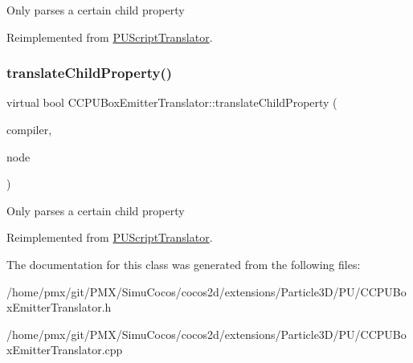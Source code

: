 Only parses a certain child property 

Reimplemented from \hyperlink{classPUScriptTranslator_a0374d83a8a04e57918975d525e0f8fe8}{P\+U\+Script\+Translator}.

\mbox{\label{classCCPUBoxEmitterTranslator_ada236c8cb79238baf289d30c266a09fa}} 
\subsubsection{\texorpdfstring{translate\+Child\+Property()}{translateChildProperty()}\hspace{0.1cm}{\footnotesize\ttfamily [2/2]}}
{\footnotesize\ttfamily virtual bool C\+C\+P\+U\+Box\+Emitter\+Translator\+::translate\+Child\+Property (\begin{DoxyParamCaption}\item[{\hyperlink{classPUScriptCompiler}{P\+U\+Script\+Compiler} $\ast$}]{compiler,  }\item[{\hyperlink{classPUAbstractNode}{P\+U\+Abstract\+Node} $\ast$}]{node }\end{DoxyParamCaption})\hspace{0.3cm}{\ttfamily [virtual]}}

Only parses a certain child property 

Reimplemented from \hyperlink{classPUScriptTranslator_a0374d83a8a04e57918975d525e0f8fe8}{P\+U\+Script\+Translator}.



The documentation for this class was generated from the following files\+:\begin{DoxyCompactItemize}
\item 
/home/pmx/git/\+P\+M\+X/\+Simu\+Cocos/cocos2d/extensions/\+Particle3\+D/\+P\+U/C\+C\+P\+U\+Box\+Emitter\+Translator.\+h\item 
/home/pmx/git/\+P\+M\+X/\+Simu\+Cocos/cocos2d/extensions/\+Particle3\+D/\+P\+U/C\+C\+P\+U\+Box\+Emitter\+Translator.\+cpp\end{DoxyCompactItemize}
